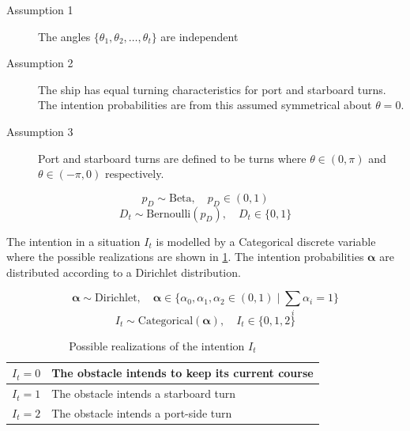\begin{description}
    \item[Assumption 1] The angles $\{\theta_1, \theta_2, \dots, \theta_t\}$ are independent
    \item[Assumption 2] The ship has equal turning characteristics for port and starboard turns. The intention probabilities are from this assumed symmetrical about $\theta=0$. 
    \item[Assumption 3] Port and starboard turns are defined to be turns where $\theta \in (0, \pi)$ and $\theta \in (-\pi, 0)$ respectively.  
\end{description}

\begin{equation}
    p_D \sim \text{Beta}, \quad p_D \in (0, 1)
\end{equation}
\begin{equation}
    D_t \sim \text{Bernoulli}(p_D), \quad D_t \in \{0, 1\}
\end{equation}

The intention in a situation $I_t$ is modelled by a Categorical discrete variable where the possible realizations are shown in \cref{tbl:intentions}. The intention probabilities $\boldsymbol{\alpha}$ are distributed according to a Dirichlet distribution.

\begin{equation}
    \boldsymbol{\alpha} \sim \text{Dirichlet}, \quad \boldsymbol{\alpha} \in \{\alpha_0, \alpha_1, \alpha_2 \in (0, 1) \; | \; \sum_i \alpha_i = 1 \}
\end{equation}
\begin{equation}
    I_t \sim \text{Categorical}(\boldsymbol{\alpha}), \quad I_t \in \{0, 1, 2\}
\end{equation}

\begin{table}[h]
\centering
\begin{tabular}{|l|l|}
\hline
$I_t=0$ & The obstacle intends to keep its current course \\ \hline
$I_t=1$ & The obstacle intends a starboard turn           \\ \hline
$I_t=2$ & The obstacle intends a port-side turn            \\ \hline
\end{tabular}
\caption{Possible realizations of the intention $I_t$}
\label{tbl:intentions}
\end{table}


